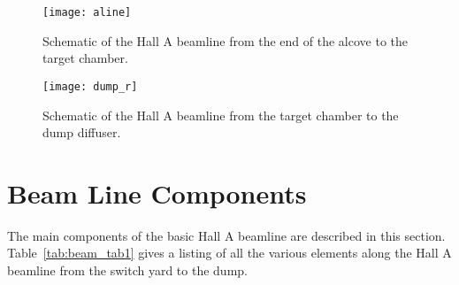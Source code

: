 \begin{figure}
\begin{center}
\texttt{[image: aline]}
\caption[Beamline: Hall A Beamline Overview]{Schematic of the Hall A beamline
from the end of the alcove to the target chamber.}
\label{fig:Aline2}
\end{center}
\end{figure}

\begin{figure}
\begin{center}
\texttt{[image: dump\_r]}
\caption[Beamline: Hall A Beamline Overview]{Schematic of the Hall A beamline
from the target chamber to the dump diffuser.}
\label{fig:Aline3}
\end{center}
\end{figure}

\section{Beam Line Components}
\label{sec:beam_line_comp}

The main components of the basic Hall A beamline are described
in this section.
Table~\ref{tab:beam_tab1} gives a listing of all the various elements
along the Hall A beamline from the switch yard to the dump.


